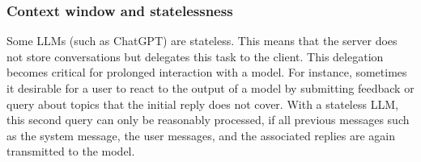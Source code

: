 {\subsubsection{Context window and statelessness}

Some \acp{LLM} (such as ChatGPT) are stateless.  This means that the server does not store conversations but delegates this task to the client.  This delegation becomes critical for prolonged interaction with a model. For instance, sometimes it desirable for a user to react to the output of a model by submitting feedback or query about topics that the initial reply does not cover. With a stateless \ac{LLM}, this second query can only be reasonably processed, if all previous messages such as the system message, the user messages, and the associated replies are again transmitted to the model. 


}
